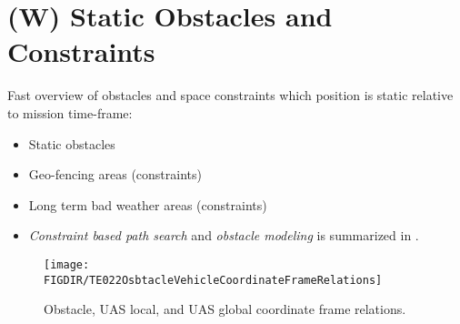 \newpage
\section{(W) Static Obstacles and Constraints}\label{s:staticObstacles}
    \noindent Fast overview of obstacles and space constraints which position is static relative to mission time-frame:
    \begin{itemize}
        \item Static obstacles
        \item Geo-fencing areas (constraints)
        \item Long term bad weather areas (constraints)
		\item \emph{Constraint based path search} and \emph{obstacle modeling} is summarized in \cite{hentenryck2009constraint}.
    \end{itemize}
    \begin{figure}[H]
        \centering
        \texttt{[image: \\FIGDIR/TE022OsbtacleVehicleCoordinateFrameRelations]} 
        \caption{Obstacle, UAS local, and UAS global coordinate frame relations.}
        \label{fig:coordinateFrameRelationsInFramework}
    \end{figure}
    
